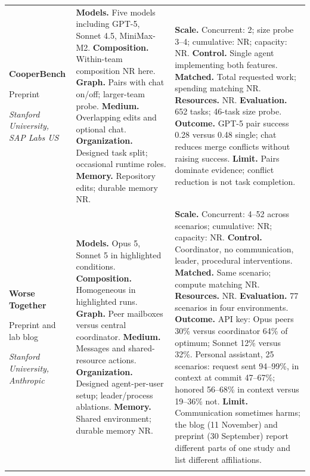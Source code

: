 \begin{longtable}{@{}>{\raggedright\arraybackslash}p{}>{\raggedright\arraybackslash}p{}>{\raggedright\arraybackslash}p{}@{}}
\textbf{CooperBench}\par \citep{cooperbench}\par Preprint\par\emph{Stanford University, SAP Labs US} & \textbf{Models.} Five models including GPT-5, Sonnet 4.5, MiniMax-M2. \textbf{Composition.} Within-team composition NR here. \textbf{Graph.} Pairs with chat on/off; larger-team probe. \textbf{Medium.} Overlapping edits and optional chat. \textbf{Organization.} Designed task split; occasional runtime roles. \textbf{Memory.} Repository edits; durable memory NR. & \textbf{Scale.} Concurrent: 2; size probe 3--4; cumulative: NR; capacity: NR. \textbf{Control.} Single agent implementing both features. \textbf{Matched.} Total requested work; spending matching NR. \textbf{Resources.} NR. \textbf{Evaluation.} 652 tasks; 46-task size probe. \textbf{Outcome.} GPT-5 pair success 0.28 versus 0.48 single; chat reduces merge conflicts without raising success. \textbf{Limit.} Pairs dominate evidence; conflict reduction is not task completion. \\ \addlinespace[5pt]
\textbf{Worse Together}\par \citep{worse-together,worse-together-blog}\par Preprint and lab blog\par\emph{Stanford University, Anthropic} & \textbf{Models.} Opus 5, Sonnet 5 in highlighted conditions. \textbf{Composition.} Homogeneous in highlighted runs. \textbf{Graph.} Peer mailboxes versus central coordinator. \textbf{Medium.} Messages and shared-resource actions. \textbf{Organization.} Designed agent-per-user setup; leader/process ablations. \textbf{Memory.} Shared environment; durable memory NR. & \textbf{Scale.} Concurrent: 4--52 across scenarios; cumulative: NR; capacity: NR. \textbf{Control.} Coordinator, no communication, leader, procedural interventions. \textbf{Matched.} Same scenario; compute matching NR. \textbf{Resources.} NR. \textbf{Evaluation.} 77 scenarios in four environments. \textbf{Outcome.} API key: Opus peers 30\% versus coordinator 64\% of optimum; Sonnet 12\% versus 32\%. Personal assistant, 25 scenarios: request sent 94--99\%, in context at commit 47--67\%; honored 56--68\% in context versus 19--36\% not. \textbf{Limit.} Communication sometimes harms; the blog (11 November) and preprint (30 September) report different parts of one study and list different affiliations. \\ \addlinespace[5pt]

\end{longtable}
